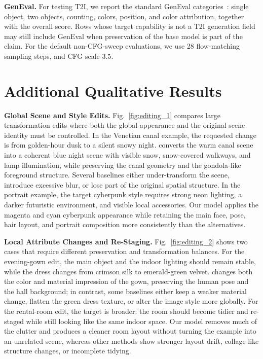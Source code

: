 \noindent\textbf{GenEval.}
For testing T2I, we report the standard GenEval categories~\cite{ghosh2023geneval}: single object, two objects, counting, colors, position, and color attribution, together with the overall score. Rows whose target capability is not a T2I generation field may still include GenEval when preservation of the base model is part of the claim. For the default non-CFG-sweep evaluations, we use 28 flow-matching sampling steps, and CFG scale $3.5$.







\section{Additional Qualitative Results}
\label{app:additional-qualitative}

\noindent\textbf{Global Scene and Style Edits.}
Fig.~\ref{fig:editing_1} compares large transformation edits where both the global appearance and the original scene identity must be controlled. In the Venetian canal example, the requested change is from golden-hour dusk to a silent snowy night. \name{} converts the warm canal scene into a coherent blue night scene with visible snow, snow-covered walkways, and lamp illumination, while preserving the canal geometry and the gondola-like foreground structure. Several baselines either under-transform the scene, introduce excessive blur, or lose part of the original spatial structure. In the portrait example, the target cyberpunk style requires strong neon lighting, a darker futuristic environment, and visible local accessories. Our model applies the magenta and cyan cyberpunk appearance while retaining the main face, pose, hair layout, and portrait composition more consistently than the alternatives.


\noindent\textbf{Local Attribute Changes and Re-Staging.}
Fig.~\ref{fig:editing_2} shows two cases that require different preservation and transformation balances. For the evening-gown edit, the main object and the indoor lighting should remain stable, while the dress changes from crimson silk to emerald-green velvet. \name{} changes both the color and material impression of the gown, preserving the human pose and the hall background; in contrast, some baselines either keep a weaker material change, flatten the green dress texture, or alter the image style more globally. For the rental-room edit, the target is broader: the room should become tidier and re-staged while still looking like the same indoor space. Our model removes much of the clutter and produces a cleaner room layout without turning the example into an unrelated scene, whereas other methods show stronger layout drift, collage-like structure changes, or incomplete tidying.

